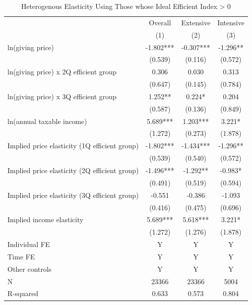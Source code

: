 \documentclass[
  11pt,
  a4paper,
]{article}
\begin{document}
  \begin{table}

  \caption{\label{tab:kableSubsetHeteroElasticity}Heterogenous Elasticity Using Those whose Ideal Efficient Index > 0}
  \centering
  \fontsize{8}{10}\selectfont
  \begin{threeparttable}
  \begin{tabular}[t]{lccc}
  \toprule
  \multicolumn{1}{c}{ } & \multicolumn{1}{c}{Overall} & \multicolumn{1}{c}{Extensive} & \multicolumn{1}{c}{Intensive} \\
  \cmidrule(l{3pt}r{3pt}){2-2} \cmidrule(l{3pt}r{3pt}){3-3} \cmidrule(l{3pt}r{3pt}){4-4}
   & (1) & (2) & (3)\\
  \midrule
  ln(giving price) & -1.802*** & -0.307*** & -1.296**\\
   & (0.539) & (0.116) & (0.572)\\
  ln(giving price) x 2Q efficient group & 0.306 & 0.030 & 0.313\\
   & (0.647) & (0.145) & (0.784)\\
  ln(giving price) x 3Q efficient group & 1.252** & 0.224* & 0.204\\
   & (0.587) & (0.136) & (0.849)\\
  ln(annual taxable income) & 5.689*** & 1.203*** & 3.221*\\
   & (1.272) & (0.273) & (1.878)\\
  Implied price elasticity (1Q efficient group) & -1.802*** & -1.434*** & -1.296**\\
   & (0.539) & (0.540) & (0.572)\\
  Implied price elasticity (2Q efficient group) & -1.496*** & -1.292** & -0.983*\\
   & (0.491) & (0.519) & (0.594)\\
  Implied price elasticity (3Q efficient group) & -0.551 & -0.386 & -1.093\\
   & (0.416) & (0.475) & (0.696)\\
  Implied income elasticity & 5.689*** & 5.618*** & 3.221*\\
   & (1.272) & (1.276) & (1.878)\\
  Individual FE & Y & Y & Y\\
  Time FE & Y & Y & Y\\
  Other controls & Y & Y & Y\\
  N & 23366 & 23366 & 5004\\
  R-squared & 0.633 & 0.573 & 0.804\\
  \bottomrule
  \end{tabular}

\end{threeparttable}
\end{table}
\end{document}
